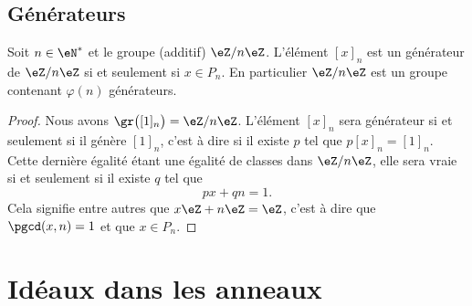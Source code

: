 \subsection{Générateurs}

\begin{proposition}     \label{PropZnmuphiGensn}
    Soit \( n\in\eN^*\) et le groupe (additif) \( \eZ/n\eZ\). L'élément \( [x]_n\) est un générateur de \( \eZ/n\eZ\) si et seulement si \( x\in P_n\). En particulier \( \eZ/n\eZ\) est un groupe contenant \( \varphi(n)\) générateurs.
\end{proposition}

\begin{proof}
    Nous avons \( \gr\big( [1]_n \big)=\eZ/n\eZ\). L'élément \( [x]_n\) sera générateur si et seulement si il génère \( [1]_n \), c'est à dire si il existe \( p\) tel que \( p[x]_n=[1]_n\). Cette dernière égalité étant une égalité de classes dans \( \eZ/n\eZ\), elle sera vraie si et seulement si il existe \( q\) tel que
    \begin{equation}
        px+qn=1.
    \end{equation}
    Cela signifie entre autres que \( x\eZ+n\eZ=\eZ\), c'est à dire que \( \pgcd(x,n)=1\) et que \( x\in P_n\).
\end{proof}

\section{Idéaux dans les anneaux}


